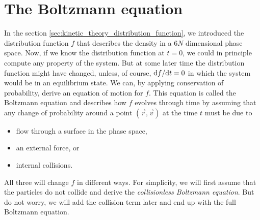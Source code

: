 \section{The Boltzmann equation}
\label{sec:boltzmann_equation}
In the section \ref{sec:kinetic_theory_distribution_function}, we introduced the distribution function $f$ that describes the density in a $6N$ dimensional phase space. Now, if we know the distribution function at $t=0$, we could in principle compute any property of the system. But at some later time the distribution function might have changed, unless, of course, $\mathrm{d}f/\mathrm{d}t = 0$ in which the system would be in an equilibrium state. We can, by applying conservation of probability, derive an equation of motion for $f$. This equation is called the Boltzmann equation and describes how $f$ evolves through time by assuming that any change of probability around a point $(\vec r, \vec v)$ at the time $t$ must be due to
\begin{itemize}
	\item flow through a surface in the phase space,
	\item an external force, or
	\item internal collisions.
\end{itemize}
All three will change $f$ in different ways. For simplicity, we will first assume that the particles do not collide and derive the \textit{collisionless Boltzmann equation}. But do not worry, we will add the collision term later and end up with the full Boltzmann equation.

